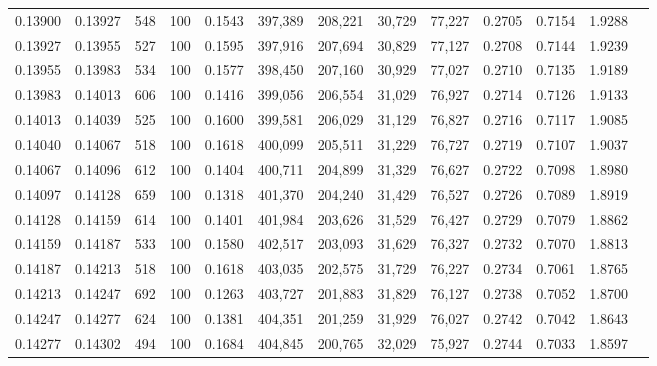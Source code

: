 \begin{tabular}{rrrrrrrrrrrrr}
0.13900 & 0.13927 &   548 & 100 &                                     0.1543 & 397,389 & 208,221 &  30,729 &  77,227 & 0.2705 & 0.7154 & 1.9288 \\
0.13927 & 0.13955 &   527 & 100 &                                     0.1595 & 397,916 & 207,694 &  30,829 &  77,127 & 0.2708 & 0.7144 & 1.9239 \\
0.13955 & 0.13983 &   534 & 100 &                                     0.1577 & 398,450 & 207,160 &  30,929 &  77,027 & 0.2710 & 0.7135 & 1.9189 \\
0.13983 & 0.14013 &   606 & 100 &                                     0.1416 & 399,056 & 206,554 &  31,029 &  76,927 & 0.2714 & 0.7126 & 1.9133 \\
0.14013 & 0.14039 &   525 & 100 &                                     0.1600 & 399,581 & 206,029 &  31,129 &  76,827 & 0.2716 & 0.7117 & 1.9085 \\
0.14040 & 0.14067 &   518 & 100 &                                     0.1618 & 400,099 & 205,511 &  31,229 &  76,727 & 0.2719 & 0.7107 & 1.9037 \\
0.14067 & 0.14096 &   612 & 100 &                                     0.1404 & 400,711 & 204,899 &  31,329 &  76,627 & 0.2722 & 0.7098 & 1.8980 \\
0.14097 & 0.14128 &   659 & 100 &                                     0.1318 & 401,370 & 204,240 &  31,429 &  76,527 & 0.2726 & 0.7089 & 1.8919 \\
0.14128 & 0.14159 &   614 & 100 &                                     0.1401 & 401,984 & 203,626 &  31,529 &  76,427 & 0.2729 & 0.7079 & 1.8862 \\
0.14159 & 0.14187 &   533 & 100 &                                     0.1580 & 402,517 & 203,093 &  31,629 &  76,327 & 0.2732 & 0.7070 & 1.8813 \\
0.14187 & 0.14213 &   518 & 100 &                                     0.1618 & 403,035 & 202,575 &  31,729 &  76,227 & 0.2734 & 0.7061 & 1.8765 \\
0.14213 & 0.14247 &   692 & 100 &                                     0.1263 & 403,727 & 201,883 &  31,829 &  76,127 & 0.2738 & 0.7052 & 1.8700 \\
0.14247 & 0.14277 &   624 & 100 &                                     0.1381 & 404,351 & 201,259 &  31,929 &  76,027 & 0.2742 & 0.7042 & 1.8643 \\
0.14277 & 0.14302 &   494 & 100 &                                     0.1684 & 404,845 & 200,765 &  32,029 &  75,927 & 0.2744 & 0.7033 & 1.8597 \\

\end{tabular}
